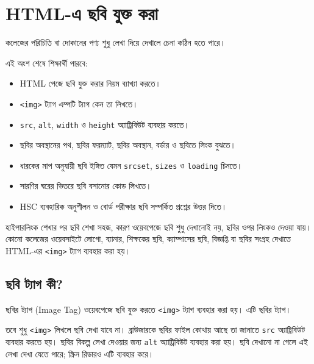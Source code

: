 \section{HTML-এ ছবি যুক্ত করা}

কলেজের পরিচিতি বা দোকানের পণ্য শুধু লেখা দিয়ে দেখালে চেনা কঠিন হতে পারে।



\begin{learningbox}
এই অংশ শেষে শিক্ষার্থী পারবে:
\begin{itemize}
\item HTML পেজে ছবি যুক্ত করার নিয়ম ব্যাখ্যা করতে।
\item \texttt{<img>} ট্যাগ এম্পটি ট্যাগ কেন তা লিখতে।
\item \texttt{src}, \texttt{alt}, \texttt{width} ও \texttt{height} অ্যাট্রিবিউট ব্যবহার করতে।
\item ছবির অবস্থানের পথ, ছবির ফরম্যাট, ছবির অবস্থান, বর্ডার ও ছবিতে লিংক বুঝতে।
\item ধারকের মাপ অনুযায়ী ছবি ইঙ্গিত যেমন \texttt{srcset}, \texttt{sizes} ও \texttt{loading} চিনতে।
\item সারণির ঘরের ভিতরে ছবি বসানোর কোড লিখতে।
\item HSC ব্যবহারিক অনুশীলন ও বোর্ড পরীক্ষার ছবি সম্পর্কিত প্রশ্নের উত্তর দিতে।
\end{itemize}
\end{learningbox}

হাইপারলিংক শেখার পর ছবি শেখা সহজ, কারণ ওয়েবপেজে ছবি শুধু দেখানোই নয়, ছবির ওপর লিংকও দেওয়া যায়। কোনো কলেজের ওয়েবসাইটে লোগো, ব্যানার, শিক্ষকের ছবি, ক্যাম্পাসের ছবি, বিজ্ঞপ্তি বা ছবির সংগ্রহ দেখাতে HTML-এর \texttt{<img>} ট্যাগ ব্যবহার করা হয়।

\subsection{ছবি ট্যাগ কী?}

\begin{definitionbox}{ছবির ট্যাগ (Image Tag)}
ওয়েবপেজে ছবি যুক্ত করতে \texttt{<img>} ট্যাগ ব্যবহার করা হয়। এটি ছবির ট্যাগ।
\end{definitionbox}

তবে শুধু \texttt{<img>} লিখলে ছবি দেখা যাবে না। ব্রাউজারকে ছবির ফাইল কোথায় আছে তা জানাতে \texttt{src} অ্যাট্রিবিউট ব্যবহার করতে হয়। ছবির বিকল্প লেখা দেওয়ার জন্য \texttt{alt} অ্যাট্রিবিউট ব্যবহার করা হয়। ছবি দেখানো না গেলে এই লেখা দেখা যেতে পারে; স্ক্রিন রিডারও এটি ব্যবহার করে।

